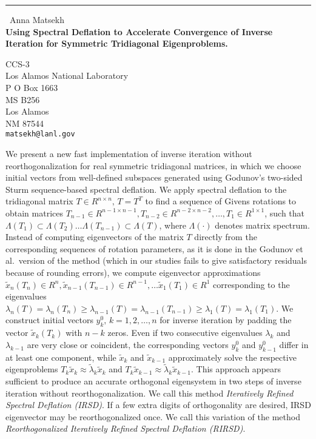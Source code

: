 \documentclass{report}
\begin{document}
\begin{center}
\rule{6in}{1pt} \
{\large Anna Matsekh \\
{\bf Using Spectral Deflation to Accelerate Convergence of Inverse Iteration for Symmetric Tridiagonal Eigenproblems.}}

CCS-3 \\ Los Alamos National Laboratory \\ P O Box 1663 \\ MS B256 \\ Los Alamos \\ NM 87544
\\
{\tt matsekh@lanl.gov}\end{center}

We present a new fast implementation of inverse iteration without
reorthogonalization for real symmetric tridiagonal matrices,
in which we choose initial vectors from well-defined
subspaces generated using Godunov's two-sided Sturm sequence-based spectral
deflation. We apply spectral deflation to the
tridiagonal matrix $T \in R^{n\times n},\, T = T^T$ to find a
sequence of Givens rotations to obtain matrices $T_{n-1} \in R^{n-1 \times
n-1}, T_{n-2} \in R^{n-2 \times n-2},\ldots, T_{1} \in R^{1\times
1}$, such that $\Lambda(T_{1}) \subset \Lambda(T_{2})\ldots
\Lambda(T_{n-1}) \subset \Lambda(T)$, where $\Lambda(\cdot)$
denotes matrix spectrum. Instead of computing eigenvectors
of the matrix $T$ directly from the corresponding sequences of
rotation parameters, as it is done in the Godunov et al.\
version of the method (which in our studies fails to give
satisfactory residuals because of rounding errors), we compute
eigenvector approximations $\tilde{x}_n(T_n) \in R^{n},
\tilde{x}_{n-1}(T_{n-1}) \in R^{n-1}, \ldots \tilde{x}_1(T_1) \in
R^{1}$ corresponding to the eigenvalues
$\lambda_n(T)=\lambda_n(T_n) \geq
\lambda_{n-1}(T)=\lambda_{n-1}(T_{n-1}) \geq
\lambda_1(T)=\lambda_1(T_1)$. We construct initial vectors
${y^0_k},\, k = 1, 2, \ldots, n$ for inverse iteration by padding
the vector $\tilde{x}_k(T_{k})$ with $n-k$ zeros. Even if two
consecutive eigenvalues $\lambda_k$ and $\lambda_{k-1}$ are very
close or coincident, the corresponding vectors ${y^0_k}$ and
${y^0_{k-1}}$ differ in at least one component, while
$\tilde{x}_k$ and $\tilde{x}_{k-1}$ approximately solve the
respective eigenproblems $T_{k} \tilde{x}_{k} \approx
\tilde{\lambda}_{k} \tilde{x}_k$ and $T_{k} \tilde{x}_{k-1}
\approx \tilde{\lambda}_{k} \tilde{x}_{k-1}$. This approach appears
sufficient to produce an accurate orthogonal eigensystem
in two steps of inverse iteration without reorthogonalization. We
call this method \emph{Iteratively Refined Spectral Deflation (IRSD)}.
If a few extra digits of orthogonality are desired, IRSD eigenvector
may be reorthogonalized once. We call this variation of the method
\emph{Reorthogonalized Iteratively Refined Spectral Deflation (RIRSD)}.
\end{document}
